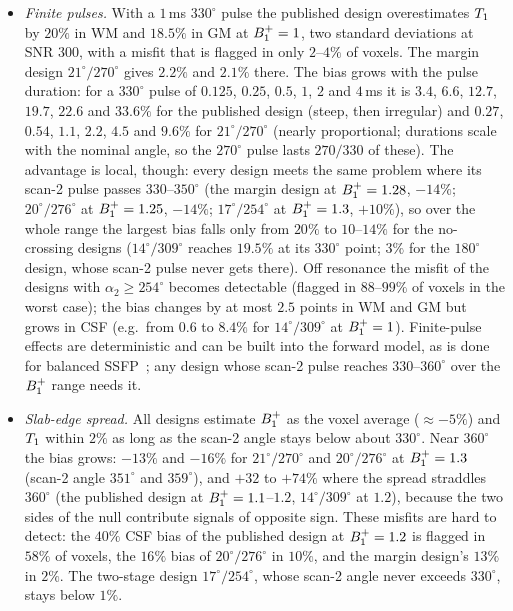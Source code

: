 \begin{itemize}
\item \emph{Finite pulses.} With a $1$\,ms $330^\circ$ pulse the published design overestimates $T_1$ by $20\%$
  in WM and $18.5\%$ in GM at $B_1^{+}=1$, two standard deviations at SNR 300, with a misfit that is flagged
  in only $2$--$4\%$ of voxels. The margin design $21^\circ/270^\circ$ gives $2.2\%$ and $2.1\%$ there. The bias grows with
  the pulse duration: for a $330^\circ$ pulse of $0.125$, $0.25$, $0.5$, $1$, $2$ and $4$\,ms it is $3.4$, $6.6$, $12.7$,
  $19.7$, $22.6$ and $33.6\%$ for the published design (steep, then irregular) and $0.27$, $0.54$, $1.1$, $2.2$,
  $4.5$ and $9.6\%$ for $21^\circ/270^\circ$ (nearly proportional; durations scale with the nominal angle, so the
  $270^\circ$ pulse lasts $270/330$ of these). The advantage is local, though: every design meets the same
  problem where its scan-2 pulse passes $330$--$350^\circ$ (the margin design at $B_1^{+}=1.28$, $-14\%$; $20^\circ/276^\circ$ at
  $B_1^{+}=1.25$, $-14\%$; $17^\circ/254^\circ$ at $B_1^{+}=1.3$, $+10\%$), so over the whole range the largest bias falls only from
  $20\%$ to $10$--$14\%$ for the no-crossing designs ($14^\circ/309^\circ$ reaches $19.5\%$ at its $330^\circ$ point; $3\%$ for the
  $180^\circ$ design, whose scan-2 pulse never gets there). Off resonance the
  misfit of the designs with $\alpha_2\ge254^\circ$ becomes detectable (flagged in $88$--$99\%$ of voxels in the
  worst case); the bias changes by at most $2.5$ points in WM and GM but grows in CSF (e.g.\ from
  $0.6$ to $8.4\%$ for $14^\circ/309^\circ$ at $B_1^{+}=1$). Finite-pulse effects are deterministic and can be built into the
  forward model, as is done for balanced SSFP~\cite{bieri2009}; any design whose scan-2 pulse reaches
  $330$--$360^\circ$ over the $B_1^{+}$ range needs it.
\item \emph{Slab-edge spread.} All designs estimate $B_1^{+}$ as the voxel average ($\approx-5\%$) and $T_1$ within
  $2\%$ as long as the scan-2 angle stays below about $330^\circ$. Near $360^\circ$ the bias grows: $-13\%$ and $-16\%$
  for $21^\circ/270^\circ$ and $20^\circ/276^\circ$ at $B_1^{+}=1.3$ (scan-2 angle $351^\circ$ and $359^\circ$), and $+32$ to $+74\%$ where the
  spread straddles $360^\circ$ (the published design at $B_1^{+}=1.1$--$1.2$, $14^\circ/309^\circ$ at $1.2$), because the two sides of
  the null contribute signals of opposite sign. These misfits are hard to detect: the $40\%$ CSF
  bias of the published design at $B_1^{+}=1.2$ is flagged in $58\%$ of voxels, the $16\%$ bias of $20^\circ/276^\circ$ in
  $10\%$, and the margin design's $13\%$ in $2\%$. The two-stage design $17^\circ/254^\circ$, whose scan-2 angle never
  exceeds $330^\circ$, stays below $1\%$.
\end{itemize}

